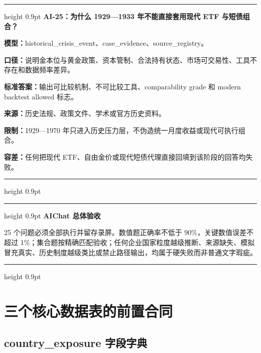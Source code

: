 \documentclass[UTF8,fontset=windows,12pt,openany]{ctexbook}
\newenvironment{decisionbox}[1][]{%
  \par\medskip\noindent\begin{center}\begin{minipage}{0.93\textwidth}%
  \color{OceanBlue}\hrule height 0.9pt\vspace{0.45em}%
  \textbf{#1}\par\smallskip\color{black}%
}{%
  \par\vspace{0.35em}\color{OceanBlue}\hrule height 0.9pt%
  \end{minipage}\end{center}\medskip%
}
\newenvironment{gatebox}[1][]{%
  \par\medskip\noindent\begin{center}\begin{minipage}{0.93\textwidth}%
  \color{GoldLine}\hrule height 0.9pt\vspace{0.45em}%
  \textbf{#1}\par\smallskip\color{black}%
}{%
  \par\vspace{0.35em}\color{GoldLine}\hrule height 0.9pt%
  \end{minipage}\end{center}\medskip%
}
\newcommand{\CardRow}[2]{\noindent\textbf{#1：}#2\par}
\begin{document}
\begin{decisionbox}[AI-25：为什么 1929—1933 年不能直接套用现代 ETF 与短债组合？]
\CardRow{模型}{historical\_crisis\_event、case\_evidence、source\_registry。}
\CardRow{口径}{说明金本位与黄金政策、资本管制、合法持有状态、市场可交易性、工具不存在和数据频率差异。}
\CardRow{标准答案}{输出可比较机制、不可比较工具、comparability grade 和 modern backtest allowed 标志。}
\CardRow{来源}{历史法规、政策文件、学术或官方历史资料。}
\CardRow{限制}{1929—1970 年只进入历史压力层，不伪造统一月度收益或现代可执行组合。}
\CardRow{容差}{任何把现代 ETF、自由金价或现代短债代理直接回填到该阶段的回答均失败。}
\end{decisionbox}

\begin{gatebox}[AIChat 总体验收]
25 个问题必须全部执行并留存录屏。数值题正确率不低于 90\%，关键数值误差不超过 1\%；集合题按精确匹配验收；任何企业国家粒度越级推断、来源缺失、模拟冒充真实、历史制度越级类比或禁止路径输出，均属于硬失败而非普通文字瑕疵。
\end{gatebox}

\part{三个核心数据表的前置合同}

\chapter{country\_exposure 字段字典}
\end{document}
